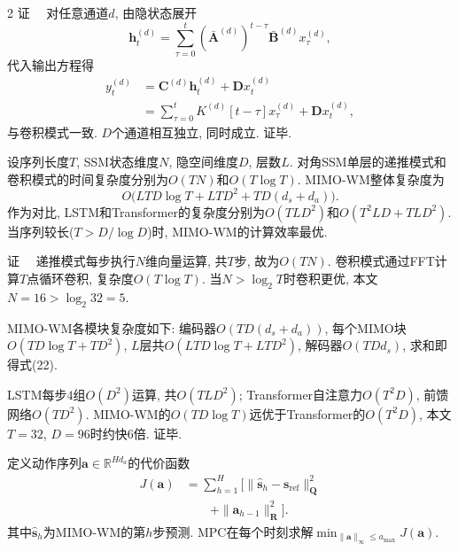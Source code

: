 \begin{multicols}{2}
{证}~~
对任意通道$d$, 由隐状态展开
\begin{equation}
{\bm h}_t^{(d)} = \sum_{\tau=0}^{t} (\bar{{\bm A}}^{(d)})^{t-\tau} \bar{{\bm B}}^{(d)} x_\tau^{(d)},
\end{equation}
代入输出方程得
\begin{equation}
\begin{aligned}
y_t^{(d)} &= {\bm C}^{(d)}{\bm h}_t^{(d)} + {\bm D}x_t^{(d)} \\
&= \sum_{\tau=0}^{t} K^{(d)}[t{-}\tau] x_\tau^{(d)} + {\bm D}x_t^{(d)},
\end{aligned}
\end{equation}
与卷积模式一致. $D$个通道相互独立, 同时成立. 证毕.
\begin{Thm}
\label{thm:complexity}
设序列长度$T$, SSM状态维度$N$, 隐空间维度$D$, 层数$L$.
对角SSM单层的递推模式和卷积模式的时间复杂度分别为$O(TN)$和$O(T\log T)$.
MIMO-WM整体复杂度为
\begin{equation}
O\big(LTD\log T + LTD^2 + TD(d_s+d_a)\big).
\end{equation}
作为对比, LSTM和Transformer的复杂度分别为$O(TLD^2)$和$O(T^2LD+TLD^2)$.
当序列较长($T > D/\log D$)时, MIMO-WM的计算效率最优.
\end{Thm}

{证}~~
递推模式每步执行$N$维向量运算, 共$T$步, 故为$O(TN)$.
卷积模式通过FFT计算$T$点循环卷积, 复杂度$O(T\log T)$.
当$N > \log_2 T$时卷积更优, 本文$N=16 > \log_2 32 = 5$.

MIMO-WM各模块复杂度如下:
编码器$O(TD(d_s+d_a))$, 每个MIMO块$O(TD\log T + TD^2)$,
$L$层共$O(LTD\log T + LTD^2)$, 解码器$O(TDd_s)$,
求和即得式(22).

LSTM每步$4$组$O(D^2)$运算, 共$O(TLD^2)$;
Transformer自注意力$O(T^2D)$, 前馈网络$O(TD^2)$.
MIMO-WM的$O(TD\log T)$远优于Transformer的$O(T^2D)$,
本文$T=32$, $D=96$时约快$6$倍.
证毕.

\begin{Def}
\label{def:cem_cost}
定义动作序列${\bm a} \in \mathbb{R}^{Hd_a}$的代价函数
\begin{equation}
\begin{aligned}
J({\bm a}) &= \sum_{h=1}^{H}\Big[\|\hat{{\bm s}}_{h} - {\bm s}_{\text{ref}}\|_{{\bm Q}}^2 \\
&\qquad + \|{\bm a}_{h-1}\|_{{\bm R}}^2\Big].
\end{aligned}
\end{equation}
其中$\hat{{\bm s}}_{h}$为MIMO-WM的第$h$步预测.
MPC在每个时刻求解$\min_{\|{\bm a}\|_\infty \leqslant a_{\max}} J({\bm a})$.
\end{Def}


\end{multicols}
